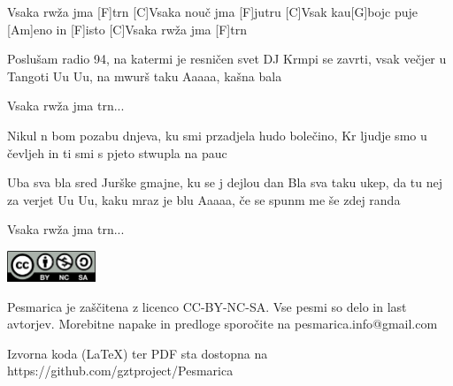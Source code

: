 \documentclass[a4paper,12pt]{article}
\begin{document}
\begin{multicols}{2}
\begin{guitar}
[C]Vsaka rwža jma [F]trn
[C]Vsaka nouč jma [F]jutru
[C]Vsak kau[G]bojc puje [Am]eno in [F]isto
[C]Vsaka rwža jma [F]trn


Poslušam radio 94, na katermi je resničen svet
DJ Krmpi se zavrti, vsak večjer u Tangoti
Uu Uu, na mwurš taku
Aaaaa, kašna bala


Vsaka rwža jma trn...


Nikul n bom pozabu dnjeva, 
ku smi przadjela hudo bolečino,
Kr ljudje smo u čevljeh 
in ti smi s pjeto stwupla na pauc


Uba sva bla sred Jurške gmajne, 
ku se j dejlou dan
Bla sva taku ukep, da tu nej za verjet
Uu Uu, kaku mraz je blu
Aaaaa, če se spunm me še zdej randa


Vsaka rwža jma trn...

\end{guitar}
\end{multicols}
\clearpage
\clearpage
\null
\vfill
\center
\includegraphics[width=100px]{img/licence.png}

Pesmarica je zaščitena z licenco CC-BY-NC-SA. Vse pesmi so delo in last avtorjev. Morebitne napake in predloge sporočite na pesmarica.info@gmail.com 

Izvorna koda (LaTeX) ter PDF sta dostopna na https://github.com/gztproject/Pesmarica
\end{document}
